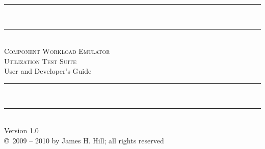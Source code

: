 
\newcommand{\hr}{\rule{\linewidth}{0.5mm}}

\begin{titlepage}
\begin{center}

\hr
\\
\hr
\\[0.1in]
\textsc{\Huge Component Workload Emulator
\\[0.05in]
Utilization Test Suite}
\\[0.3in]
{\huge User and Developer's Guide}
\\[0.1in]
\hr
\\
\hr
\\
\vfill
{\large Version 1.0}
\\
{\large \copyright\ 2009 -- 2010 by James H. Hill; all rights reserved}
\end{center}
\end{titlepage}
